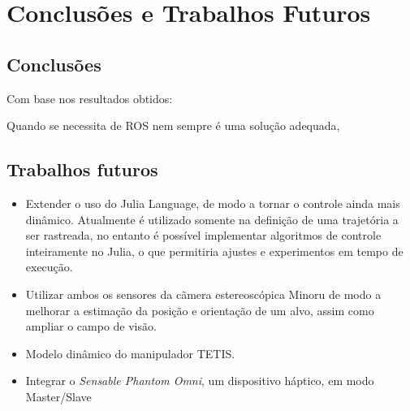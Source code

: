 \chapter{Conclusões e Trabalhos Futuros}

\section{Conclusões}
Com base nos resultados obtidos:

Quando se necessita de ROS nem sempre é uma solução adequada,

\section{Trabalhos futuros}
\begin{itemize}
\item Extender o uso do Julia Language, de modo a tornar o controle ainda mais dinâmico. Atualmente é utilizado somente na definição de uma trajetória a ser rastreada, no entanto é possível implementar algoritmos de controle inteiramente no Julia, o que permitiria ajustes e experimentos em tempo de execução.
\item Utilizar ambos os sensores da cãmera estereoscópica Minoru de modo a melhorar a estimação da posição e orientação de um alvo, assim como ampliar o campo de visão.
\item Modelo dinâmico do manipulador TETIS. 
\item Integrar o \textit{Sensable Phantom Omni}, um dispositivo háptico, em modo Master/Slave
\end{itemize}